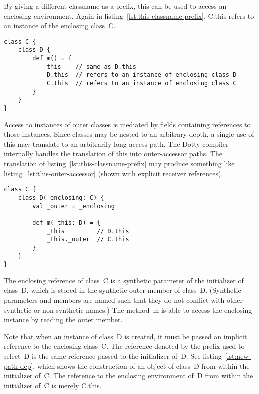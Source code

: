 By giving a different classname as a prefix, {\cd this} can be used to access an enclosing environment. Again in listing~\ref{lst:this-classname-prefix}, \mbox{\cd C.this} refers to an instance of the enclosing class~{\cd C}.

\begin{lstlisting}[float=htbp, caption={``This'' with Classname Prefix}, label={lst:this-classname-prefix}]
class C {
	class D {
		def m() = {
			this    // same as D.this
			D.this  // refers to an instance of enclosing class D
			C.this  // refers to an instance of enclosing class C
		}
	}
}
\end{lstlisting}

Access to instances of outer classes is mediated by fields containing references to those instances. Since classes may be nested to an arbitrary depth, a single use of {\cd this} may translate to an arbitrarily-long access path. The Dotty compiler internally handles the translation of {\cd this} into outer-accessor paths. The translation of listing~\ref{lst:this-classname-prefix} may produce something like listing~\ref{lst:this-outer-accessor} (shown with explicit receiver references).

\begin{lstlisting}[float=htbp, caption={``This'' to Outer-Accessor Path Translation}, label={lst:this-outer-accessor}]
class C {
	class D(_enclosing: C) {
		val _outer = _enclosing

		def m(_this: D) = {
			_this         // D.this
			_this._outer  // C.this
		}
	}
}
\end{lstlisting}

The {\cd \und enclosing} reference of class~{\cd C} is a synthetic parameter of the initializer of class~{\cd D}, which is stored in the synthetic {\cd \und outer} member of class~{\cd D}. (Synthetic parameters and members are named such that they do not conflict with other synthetic or non-synthetic names.) The method~{\cd m} is able to access the enclosing instance by reading the {\cd \und outer} member.

Note that when an instance of class~{\cd D} is created, it must be passed an implicit reference to the enclosing class~{\cd C}. The reference denoted by the prefix used to select~{\cd D} is the same reference passed to the initializer of~{\cd D}. See listing~\ref{lst:new-path-dep}, which shows the construction of an object of class~{\cd D} from within the initializer of~{\cd C}. The reference to the enclosing environment of~{\cd D} from within the initializer of~{\cd C} is merely \mbox{\cd C.this}.

